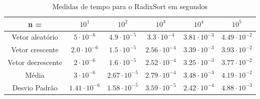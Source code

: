 \documentclass{article}
\begin{document}
\begin{table}
    \begin{tabular}{c|c|c|c|c|c}
        n = & $10^{1}$ & $10^{2}$ & $10^{3}$ & $10^{4}$ & $10^{5}$ \\ 
        \hline
        Vetor aleatório & $5\cdot 10^{-6}$ & $4.9\cdot 10^{-5}$ & $3.3\cdot 10^{-4}$ & $3.81\cdot 10^{-3}$ & $4.49\cdot 10^{-2}$ \\
        \hline
        Vetor crescente & $2.0\cdot10^{-6}$ & $1.5\cdot 10^{-5}$ & $2.56\cdot 10^{-4}$ & $3.39\cdot 10^{-3}$ & $3.93\cdot 10^{-2}$\\
        \hline
        Vetor decrescente & $2\cdot10^{-6}$ & $1.6\cdot 10^{-5}$ & $2.52\cdot 10^{-4}$ & $3.25\cdot 10^{-3}$ & $3.77\cdot 10^{-2}$\\
        \hline
        Média & $3\cdot 10^{-6}$ & $2.67\cdot 10^{-5}$ & $2.79\cdot10^{-4}$ & $3.48\cdot 10^{-3}$ & $4.19\cdot 10^{-2}$ \\
        \hline
        Desvio Padrão & $1.41\cdot 10^{-6}$ & $1.58\cdot 10^{-5}$ & $3.59\cdot 10^{-5}$ & $2.42\cdot 10^{-4}$ & $4.88\cdot 10^{-3}$ \\
    \end{tabular}
    \caption{Medidas de tempo para o RadixSort em segundos}
\end{table}\par
%
\end{document}
